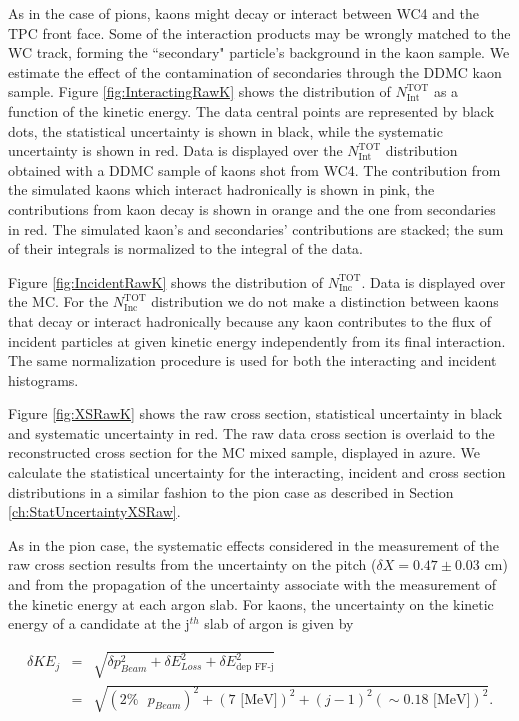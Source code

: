 As in the case of pions, kaons might decay or interact between WC4 and the TPC front face. Some of the interaction products may be wrongly matched to the WC track, forming the ``secondary" particle's background in the kaon sample. We estimate the effect of the contamination of secondaries through  the DDMC kaon sample.
Figure \ref{fig:InteractingRawK} shows the distribution of  $N^{\text{TOT}}_{\text{Int}}$  as a function of the kinetic energy. The data central points are represented by black dots, the statistical uncertainty is shown in black, while the systematic uncertainty is shown in red. Data is displayed over the $N^{\text{TOT}}_{\text{Int}}$  distribution obtained with a DDMC  sample of kaons shot from WC4.  
The contribution from the simulated kaons which interact hadronically is shown in pink, the contributions from kaon decay is shown in orange and the one from secondaries in red. 
The simulated kaon's and secondaries' contributions are stacked; the sum of their integrals is normalized to the integral of the data.
 
Figure \ref{fig:IncidentRawK} shows the distribution of  $N^{\text{TOT}}_{\text{Inc}}$. Data is displayed over the MC. For the  $N^{\text{TOT}}_{\text{Inc}}$ distribution we do not make a distinction between kaons that decay or interact hadronically because any kaon contributes to the flux of incident particles at given kinetic energy independently from its final interaction.
The same normalization procedure is used for both the interacting and incident histograms. 


Figure \ref{fig:XSRawK} shows the raw cross section, statistical uncertainty in black and systematic uncertainty in red. The raw data cross section is overlaid to the reconstructed cross section for the MC mixed sample, displayed in azure.  We calculate the statistical uncertainty for the interacting, incident and cross section distributions in a similar fashion to the pion case as described in Section \ref{ch:StatUncertaintyXSRaw}. 

As in the pion case, the systematic effects considered in the measurement of the raw cross section results from the uncertainty on the pitch ($\delta X = 0.47 \pm 0.03$ cm) and from the propagation of the uncertainty associate with the measurement of the kinetic energy at each argon slab. For kaons, the uncertainty on the kinetic energy of a candidate at the j$^{th}$ slab of argon  is given by

\begin{eqnarray}
\delta KE_{j} &=& \sqrt{\delta p_{Beam}^2 + \delta E_{Loss}^2 +  \delta  E_{\text{dep FF-j}}^2}\\
&=& \sqrt{(2\% \text{ }p_{Beam})^2 +  (7 \text{ [MeV]})^2 +  (j-1)^2 (\sim0.18\text{ [MeV]})^2}.
\end{eqnarray}

